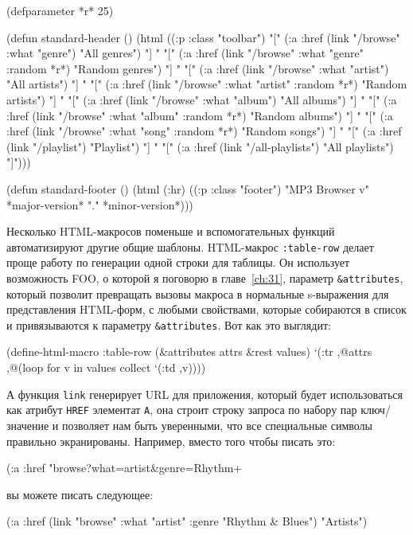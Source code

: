\begin{myverb}
(defparameter *r* 25)

(defun standard-header ()
  (html
   ((:p :class "toolbar")
    "[" (:a :href (link "/browse" :what "genre") "All genres") "] "
    "[" (:a :href (link "/browse" :what "genre" :random *r*) "Random genres") "] "
    "[" (:a :href (link "/browse" :what "artist") "All artists") "] "
    "[" (:a :href (link "/browse" :what "artist" :random *r*) "Random artists") "] "
    "[" (:a :href (link "/browse" :what "album") "All albums") "] "
    "[" (:a :href (link "/browse" :what "album" :random *r*) "Random albums") "] "
    "[" (:a :href (link "/browse" :what "song" :random *r*) "Random songs") "] "
    "[" (:a :href (link "/playlist") "Playlist") "] "
    "[" (:a :href (link "/all-playlists") "All playlists") "]")))

(defun standard-footer ()
  (html (:hr) ((:p :class "footer") "MP3 Browser v" *major-version* "." *minor-version*)))
\end{myverb}

Несколько HTML-макросов поменьше и вспомогательных функций автоматизируют другие общие
шаблоны. HTML-макрос \lstinline{:table-row} делает проще работу по генерации одной строки для
таблицы. Он использует возможность FOO, о которой я поговорю в главе~\ref{ch:31},
параметр \lstinline!&attributes!, который позволит превращать вызовы макроса в нормальные
s-выражения для представления HTML-форм, с любыми свойствами, которые собираются в список и
привязываются к параметру \lstinline!&attributes!. Вот как это выглядит:

\begin{myverb}
(define-html-macro :table-row (&attributes attrs &rest values)
  `(:tr ,@attrs ,@(loop for v in values collect `(:td ,v))))
\end{myverb}

А функция \lstinline{link} генерирует URL для приложения, который будет использоваться как
атрибут \lstinline{HREF} элементат \lstinline{A}, она строит строку запроса по набору пар
ключ/значение и позволяет нам быть уверенными, что все специальные символы правильно
экранированы. Например, вместо того чтобы писать это:

\begin{myverb}
(:a :href "browse?what=artist&genre=Rhythm+%
\end{myverb}

\noindent{}вы можете писать следующее:

\begin{myverb}
(:a :href (link "browse" :what "artist" :genre "Rhythm & Blues") "Artists")
\end{myverb}

